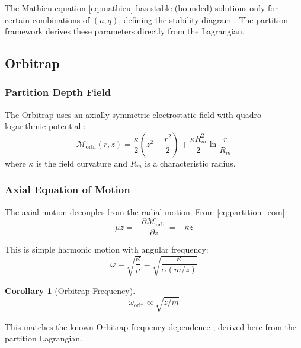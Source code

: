 \documentclass[twocolumn,10pt,a4paper]{article}
\newtheorem{corollary}[theorem]{Corollary}
\theoremstyle{definition}
\theoremstyle{remark}
\newcommand{\Mdepth}{\mathcal{M}}
\newcommand{\partinert}{\mu}
\begin{document}
The Mathieu equation \eqref{eq:mathieu} has stable (bounded) solutions only for certain combinations of $(a, q)$, defining the stability diagram \citep{paul1990}. The partition framework derives these parameters directly from the Lagrangian.

\subsection{Orbitrap}

\subsubsection{Partition Depth Field}

The Orbitrap uses an axially symmetric electrostatic field with quadro-logarithmic potential \citep{makarov2000}:
\begin{equation}
    \Mdepth_{\mathrm{orbi}}(r, z) = \frac{\kappa}{2}\left(z^2 - \frac{r^2}{2}\right) + \frac{\kappa R_m^2}{2}\ln\frac{r}{R_m}
    \label{eq:orbitrap_field}
\end{equation}
where $\kappa$ is the field curvature and $R_m$ is a characteristic radius.

\subsubsection{Axial Equation of Motion}

The axial motion decouples from the radial motion. From \eqref{eq:partition_eom}:
\begin{equation}
    \partinert\ddot{z} = -\frac{\partial \Mdepth_{\mathrm{orbi}}}{\partial z} = -\kappa z
    \label{eq:orbitrap_axial}
\end{equation}

This is simple harmonic motion with angular frequency:
\begin{equation}
    \omega = \sqrt{\frac{\kappa}{\partinert}} = \sqrt{\frac{\kappa}{\alpha(m/z)}}
    \label{eq:orbitrap_freq}
\end{equation}

\begin{corollary}[Orbitrap Frequency]
\begin{equation}
    \boxed{\omega_{\mathrm{orbi}} \propto \sqrt{z/m}}
\end{equation}
\end{corollary}

This matches the known Orbitrap frequency dependence \citep{makarov2000}, derived here from the partition Lagrangian.
\end{document}
